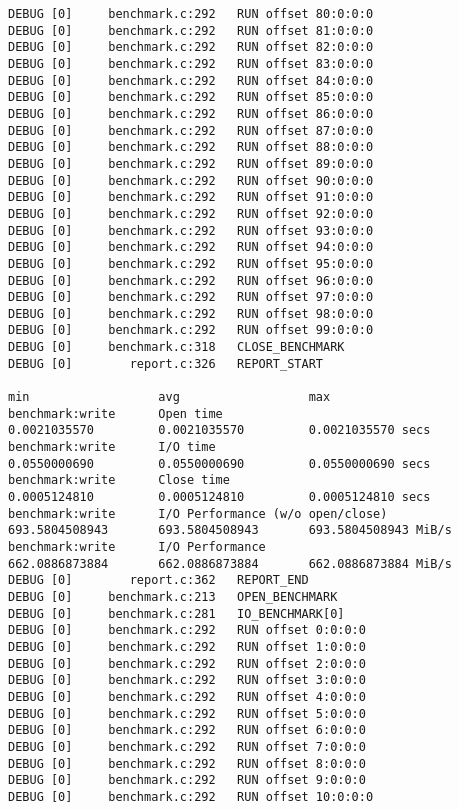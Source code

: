 \begin{verbatim}
DEBUG [0]     benchmark.c:292   RUN offset 80:0:0:0
DEBUG [0]     benchmark.c:292   RUN offset 81:0:0:0
DEBUG [0]     benchmark.c:292   RUN offset 82:0:0:0
DEBUG [0]     benchmark.c:292   RUN offset 83:0:0:0
DEBUG [0]     benchmark.c:292   RUN offset 84:0:0:0
DEBUG [0]     benchmark.c:292   RUN offset 85:0:0:0
DEBUG [0]     benchmark.c:292   RUN offset 86:0:0:0
DEBUG [0]     benchmark.c:292   RUN offset 87:0:0:0
DEBUG [0]     benchmark.c:292   RUN offset 88:0:0:0
DEBUG [0]     benchmark.c:292   RUN offset 89:0:0:0
DEBUG [0]     benchmark.c:292   RUN offset 90:0:0:0
DEBUG [0]     benchmark.c:292   RUN offset 91:0:0:0
DEBUG [0]     benchmark.c:292   RUN offset 92:0:0:0
DEBUG [0]     benchmark.c:292   RUN offset 93:0:0:0
DEBUG [0]     benchmark.c:292   RUN offset 94:0:0:0
DEBUG [0]     benchmark.c:292   RUN offset 95:0:0:0
DEBUG [0]     benchmark.c:292   RUN offset 96:0:0:0
DEBUG [0]     benchmark.c:292   RUN offset 97:0:0:0
DEBUG [0]     benchmark.c:292   RUN offset 98:0:0:0
DEBUG [0]     benchmark.c:292   RUN offset 99:0:0:0
DEBUG [0]     benchmark.c:318   CLOSE_BENCHMARK
DEBUG [0]        report.c:326   REPORT_START
                                                                               min                  avg                  max
benchmark:write      Open time                                        0.0021035570         0.0021035570         0.0021035570 secs
benchmark:write      I/O time                                         0.0550000690         0.0550000690         0.0550000690 secs
benchmark:write      Close time                                       0.0005124810         0.0005124810         0.0005124810 secs
benchmark:write      I/O Performance (w/o open/close)               693.5804508943       693.5804508943       693.5804508943 MiB/s
benchmark:write      I/O Performance                                662.0886873884       662.0886873884       662.0886873884 MiB/s
DEBUG [0]        report.c:362   REPORT_END
DEBUG [0]     benchmark.c:213   OPEN_BENCHMARK
DEBUG [0]     benchmark.c:281   IO_BENCHMARK[0]
DEBUG [0]     benchmark.c:292   RUN offset 0:0:0:0
DEBUG [0]     benchmark.c:292   RUN offset 1:0:0:0
DEBUG [0]     benchmark.c:292   RUN offset 2:0:0:0
DEBUG [0]     benchmark.c:292   RUN offset 3:0:0:0
DEBUG [0]     benchmark.c:292   RUN offset 4:0:0:0
DEBUG [0]     benchmark.c:292   RUN offset 5:0:0:0
DEBUG [0]     benchmark.c:292   RUN offset 6:0:0:0
DEBUG [0]     benchmark.c:292   RUN offset 7:0:0:0
DEBUG [0]     benchmark.c:292   RUN offset 8:0:0:0
DEBUG [0]     benchmark.c:292   RUN offset 9:0:0:0
DEBUG [0]     benchmark.c:292   RUN offset 10:0:0:0

\end{verbatim}
